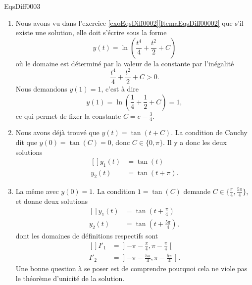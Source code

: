 
\begin{corrige}{EqsDiff0003}

\begin{enumerate}

\item
Nous avons vu dans l'exercice \ref{exoEqsDiff0002}\ref{ItemaEqsDiff00002} que s'il existe une solution, elle doit s'écrire sous la forme
\begin{equation}
	y(t)=\ln\left( \frac{ t^4 }{ 4 }+\frac{ t^2 }{ 2 }+C \right)
\end{equation}
où le domaine est déterminé par la valeur de la constante par l'inégalité
\begin{equation}
	 \frac{ t^4 }{ 4 }+\frac{ t^2 }{ 2 }+C >0.
\end{equation}
Nous demandons $y(1)=1$, c'est à dire
\begin{equation}
	y(1)= \ln\left(\frac{ 1 }{ 4 }+\frac{ 1 }{ 2 }+C\right) =1,
\end{equation}
ce qui permet de fixer la constante $C=e-\frac{ 3 }{ 4 }$.

\item
Nous avons déjà trouvé que $y(t)=\tan(t+C)$. La condition de Cauchy dit que $y(0)=\tan(C)=0$, donc $C\in\{ 0,\pi \}$. Il y a donc les deux solutions
\begin{equation}
	\begin{aligned}[]
		y_1(t)&=\tan(t)\\
		y_2(t)&=\tan(t+\pi).
	\end{aligned}
\end{equation}

\item
La même avec $y(0)=1$. La condition $1=\tan(C)$ demande $C\in\{ \frac{ \pi }{ 4 },\frac{ 5\pi }{ 4 } \}$, et donne deux solutions
\begin{equation}
	\begin{aligned}[]
		y_1(t)&=\tan(t+\frac{ \pi }{ 4 })\\
		y_2(t)&=\tan(t+\frac{ 5\pi }{ 4 }),
	\end{aligned}
\end{equation}
dont les domaines de définitions respectifs sont
\begin{equation}
	\begin{aligned}[]
		I'_1&=\mathopen]-\pi-\frac{ \pi }{ 4 },\pi-\frac{ \pi }{ 4 }\mathclose[\\
		I'_2&=\mathopen]-\pi-\frac{ 5\pi }{ 4 },\pi-\frac{ 5\pi }{ 4 }\mathclose[.
	\end{aligned}
\end{equation}
Une bonne question à se poser est de comprendre pourquoi cela ne viole pas le théorème d'unicité de la solution.


\end{enumerate}
\end{corrige}
